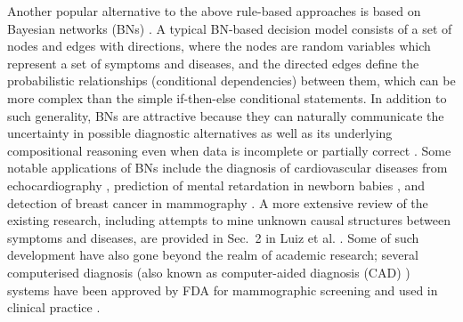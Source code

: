Another popular alternative to the above rule-based approaches is based on Bayesian networks (BNs) \cite{pearl2014probabilistic}. A typical BN-based decision model consists of a set of nodes and edges with directions, where the nodes are random variables which represent a set of symptoms and diseases, and the directed edges define the probabilistic relationships (conditional dependencies) between them, which can be more complex than the simple if-then-else conditional statements. In addition to such generality, BNs are attractive because they can naturally communicate the uncertainty in possible diagnostic alternatives as well as its underlying compositional reasoning even when data is incomplete or partially correct \cite{nikovski2000constructing}. Some notable applications of BNs include the diagnosis of cardiovascular diseases from echocardiography \cite{diez1997diaval}, prediction of mental retardation in newborn babies \cite{mani1997mentor}, and detection of breast cancer in mammography \cite{kahn1997construction,sajda2003multi,burnside2004probabilistic}. A more extensive review of the existing research, including attempts to mine unknown causal structures between symptoms and diseases, are provided in Sec.~2 in Luiz et al. \cite{seixas2014bayesian}. Some of such development have also gone beyond the realm of academic research; several computerised diagnosis (also known as computer-aided diagnosis (CAD) \cite{doi1993digital}) systems have been approved by FDA for mammographic screening  and used in clinical practice \cite{sajda2006machine}. 



\vspace{-2mm}
